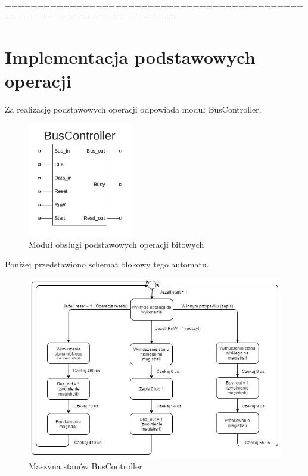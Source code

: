 \documentclass[a4paper]{article}
\begin{document}
\newpage
========================================================================

\section{Implementacja podstawowych operacji}

Za realizację podstawowych operacji odpowiada moduł BusController. 

\begin{figure}[!h]
\begin{center}
\includegraphics[height=5cm]{graphics/bus_controller_sym.png}
\end{center}
\caption{Moduł obsługi podstawowych operacji bitowych}
\label{bus_controller_sym}
\end{figure}

Poniżej przedstawiono schemat blokowy tego automatu.

\begin{figure}[!h]
\begin{center}
\includegraphics[width=15cm]{graphics/bus_controller_fsm.png}
\end{center}
\caption{Maszyna stanów BusController}
\label{bus_controller_fsm}
\end{figure}
\end{document}
